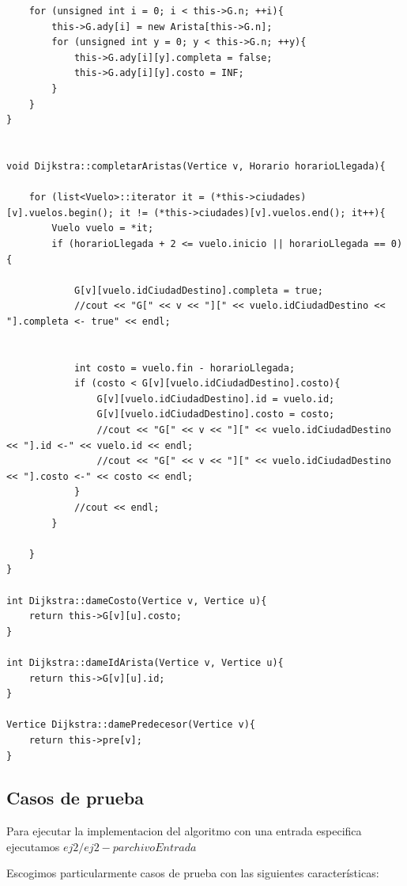 \begin{lstlisting}
	for (unsigned int i = 0; i < this->G.n; ++i){
		this->G.ady[i] = new Arista[this->G.n];
		for (unsigned int y = 0; y < this->G.n; ++y){
			this->G.ady[i][y].completa = false;
			this->G.ady[i][y].costo = INF;
		}
	}
}


void Dijkstra::completarAristas(Vertice v, Horario horarioLlegada){

	for (list<Vuelo>::iterator it = (*this->ciudades)[v].vuelos.begin(); it != (*this->ciudades)[v].vuelos.end(); it++){
		Vuelo vuelo = *it;
		if (horarioLlegada + 2 <= vuelo.inicio || horarioLlegada == 0){

			G[v][vuelo.idCiudadDestino].completa = true;
			//cout << "G[" << v << "][" << vuelo.idCiudadDestino << "].completa <- true" << endl;


			int costo = vuelo.fin - horarioLlegada;
			if (costo < G[v][vuelo.idCiudadDestino].costo){
				G[v][vuelo.idCiudadDestino].id = vuelo.id;
				G[v][vuelo.idCiudadDestino].costo = costo;
				//cout << "G[" << v << "][" << vuelo.idCiudadDestino << "].id <-" << vuelo.id << endl;
				//cout << "G[" << v << "][" << vuelo.idCiudadDestino << "].costo <-" << costo << endl;
			}
			//cout << endl;
		}

	}
}

int Dijkstra::dameCosto(Vertice v, Vertice u){
	return this->G[v][u].costo;
}

int Dijkstra::dameIdArista(Vertice v, Vertice u){
	return this->G[v][u].id;
}

Vertice Dijkstra::damePredecesor(Vertice v){
	return this->pre[v];
}

\end{lstlisting}
\bigskip


\subsection{Casos de prueba}

\noindent 
Para ejecutar la implementacion del algoritmo con una entrada especifica ejecutamos $ej2/ej2 -p archivoEntrada$

\noindent 
Escogimos particularmente casos de prueba con las siguientes características:


